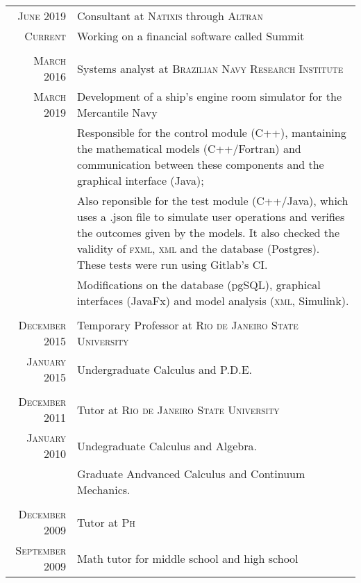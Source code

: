 \documentclass[a4paper,10pt]{article}
\begin{document}
\begin{tabular}{r|p{11cm}}
\textsc{June 2019} & Consultant at \textsc{Natixis} through \textsc{Altran}\\
\textsc{Current} & Working on a financial software called Summit\\

\multicolumn{2}{c}{}\\

\textsc{March 2016} & Systems analyst at \textsc{Brazilian Navy Research Institute}\\
\textsc{March 2019} & Development of a ship's engine room simulator for the Mercantile Navy\\&
\footnotesize{Responsible for the control module (C++), mantaining the mathematical models (C++/Fortran) and communication between these components and the graphical interface (Java);}\\&
\footnotesize{Also reponsible for the test module (C++/Java), which uses a .json file to simulate user operations and verifies the outcomes given by the models. It also checked the validity of \textsc{fxml}, \textsc{xml} and the database (Postgres). These tests were run using Gitlab's CI.}\\&
\footnotesize{Modifications on the database (pgSQL), graphical interfaces (JavaFx) and model analysis (\textsc{xml}, Simulink).}\\

\multicolumn{2}{c}{}\\

\textsc{December 2015} & Temporary Professor at \textsc{Rio de Janeiro State University}\\
\textsc{January 2015} & \footnotesize{Undergraduate Calculus and P.D.E.}\\

\multicolumn{2}{c}{}\\

\textsc{December 2011} & Tutor at \textsc{Rio de Janeiro State University}\\
\textsc{January 2010} & \footnotesize{Undegraduate Calculus and Algebra.}\\&
\footnotesize {Graduate Andvanced Calculus and Continuum Mechanics.}\\

\multicolumn{2}{c}{}\\

\textsc{December 2009} & Tutor at \textsc{Ph}\\
\textsc{September 2009} & \footnotesize{Math tutor for middle school and high school}\\
\end{tabular}
\end{document}
